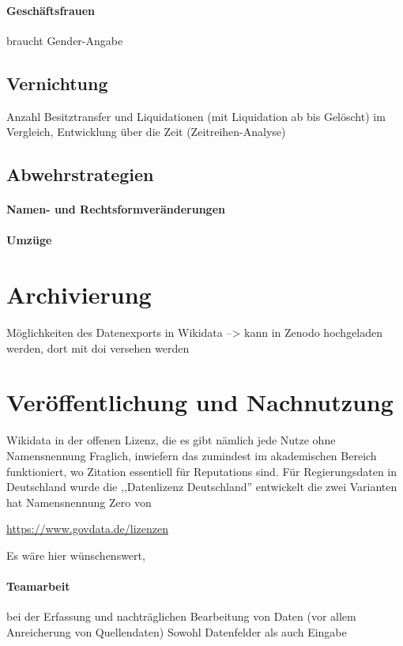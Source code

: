 \paragraph{Geschäftsfrauen}
braucht Gender-Angabe
\subsection{Vernichtung}
Anzahl Besitztransfer und Liquidationen (mit Liquidation ab bis Gelöscht) im Vergleich, Entwicklung über die Zeit (Zeitreihen-Analyse)
\paragraph{}
\subsection{Abwehrstrategien}
\paragraph{Namen- und Rechtsformveränderungen}
\paragraph{Umzüge}
\section{Archivierung}
Möglichkeiten des Datenexports in Wikidata --> kann in Zenodo hochgeladen werden, dort mit doi versehen werden




  
\section{Veröffentlichung und Nachnutzung}

Wikidata in der offenen Lizenz, die es gibt nämlich jede Nutze ohne Namensnennung
Fraglich, inwiefern das zumindest im akademischen Bereich funktioniert, wo Zitation essentiell für Reputations sind.
Für Regierungsdaten in Deutschland wurde die ,,Datenlizenz Deutschland'' entwickelt die zwei Varianten hat
Namensnennung
Zero 
von  



\url{https://www.govdata.de/lizenzen}

Es wäre hier wünschenswert, 

\paragraph{Teamarbeit}
bei der Erfassung und nachträglichen Bearbeitung von Daten (vor allem Anreicherung von Quellendaten)
Sowohl Datenfelder als auch Eingabe

